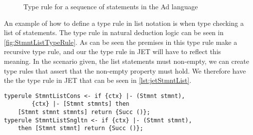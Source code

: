 \begin{figure}
    \begin{prooftree}
    \end{prooftree}
    \caption{Type rule for a sequence of statements in the Ad language}
    \label{fig:StmntListTypeRule}
\end{figure}

An example of how to define a type rule in list notation is when type checking a list of statements.
The type rule in natural deduction logic can be seen in \autoref{fig:StmntListTypeRule}.
As can be seen the premises in this type rule make a recursive type rule, and our the type rule in JET will have to reflect this meaning.
In the scenario given, the list statements must non-empty, we can create type rules that assert that the non-empty property must hold.
We therefore have the the type rule in JET that can be seen in \autoref{lst:jetStmntList}.

\begin{lstlisting}[caption = Type rule in JET for a seqeunce of statements, label=lst:jetStmntList]
typerule StmntListCons <- if {ctx} |- (Stmnt stmnt), 
        {ctx} |- [Stmnt stmnts] then 
    [Stmnt stmnt stmnts] return {Succ ()};
typerule StmntListSngltn <- if {ctx} |- (Stmnt stmnt),
    then [Stmnt stmnt] return {Succ ()};
\end{lstlisting}

